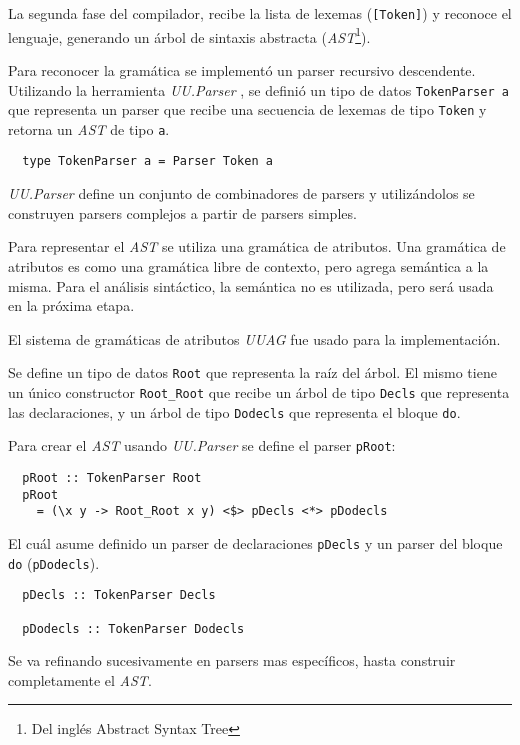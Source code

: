   La segunda fase del compilador, recibe la lista de lexemas (\texttt{[Token]}) y
reconoce el lenguaje, generando un árbol de
sintaxis abstracta (\emph{AST}\footnote{Del inglés Abstract Syntax Tree}).

  Para reconocer la gramática se implementó un parser recursivo descendente.
  Utilizando la herramienta \textit{UU.Parser} \cite{uuparser}, se definió un tipo de datos
  \texttt{TokenParser a} que representa un parser que recibe una secuencia de lexemas de tipo \texttt{Token}
  y retorna un \emph{AST} de tipo \texttt{a}.

  \begin{Verbatim}
  type TokenParser a = Parser Token a
  \end{Verbatim}

  \textit{UU.Parser} define un conjunto de combinadores de parsers y utilizándolos se construyen parsers
  complejos a partir de parsers simples.

  Para representar el \emph{AST} se utiliza una gramática de atributos.
  Una gramática de atributos es como una gramática libre de contexto, pero agrega semántica a la misma.
  Para el análisis sintáctico, la semántica no es utilizada, pero será usada en la próxima etapa.

  El sistema de gramáticas de atributos
  \textit{UUAG}\cite{uuag} fue usado para la implementación.



  Se define un tipo de datos \texttt{Root} que representa la raíz del árbol.
  El mismo tiene un único constructor \texttt{Root\_Root} que recibe un árbol de tipo
  \texttt{Decls} que representa las declaraciones, y un árbol de tipo \texttt{Dodecls} que
  representa el bloque \texttt{do}.

  Para crear el \emph{AST} usando \textit{UU.Parser} se define el parser \texttt{pRoot}:

  \begin{Verbatim}
  pRoot :: TokenParser Root
  pRoot
    = (\x y -> Root_Root x y) <$> pDecls <*> pDodecls
  \end{Verbatim}


  El cuál asume definido un parser de declaraciones \texttt{pDecls} y un parser
  del bloque \texttt{do} (\texttt{pDodecls}).

  \begin{Verbatim}
  pDecls :: TokenParser Decls

  pDodecls :: TokenParser Dodecls
  \end{Verbatim}

  Se va refinando sucesivamente en parsers mas específicos, hasta construir completamente el \emph{AST}.

